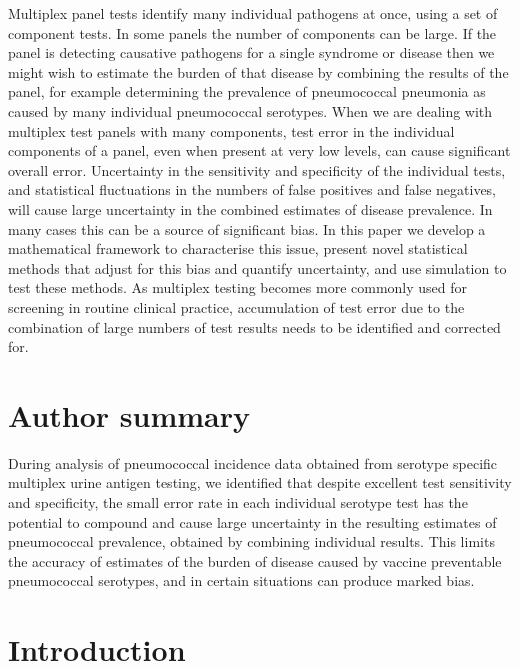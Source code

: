 \documentclass[10pt,letterpaper]{article}
\begin{document}
Multiplex panel tests identify many individual pathogens at once, using a set of component tests. In some panels the number of components can be large. If the panel is detecting causative pathogens for a single syndrome or disease then we might wish to estimate the burden of that disease by combining the results of the panel, for example determining the prevalence of pneumococcal pneumonia as caused by many individual pneumococcal serotypes. When we are dealing with multiplex test panels with many components, test error in the individual components of a panel, even when present at very low levels, can cause significant overall error. Uncertainty in the sensitivity and specificity of the individual tests, and statistical fluctuations in the numbers of false positives and false negatives, will cause large uncertainty in the combined estimates of disease prevalence. In many cases this can be a source of significant bias. In this paper we develop a mathematical framework to characterise this issue, present novel statistical methods that adjust for this bias and quantify uncertainty, and use simulation to test these methods. As multiplex testing becomes more commonly used for screening in routine clinical practice, accumulation of test error due to the combination of large numbers of test results needs to be identified and corrected for. 


\section*{Author summary}

During analysis of pneumococcal incidence data obtained from serotype specific multiplex urine antigen testing, we identified that despite excellent test sensitivity and specificity, the small error rate in each individual serotype test has the potential to compound and cause large uncertainty in the resulting estimates of pneumococcal prevalence, obtained by combining individual results. This limits the accuracy of estimates of the burden of disease caused by vaccine preventable pneumococcal serotypes, and in certain situations can produce marked bias.

\linenumbers

\section*{Introduction}
\end{document}
